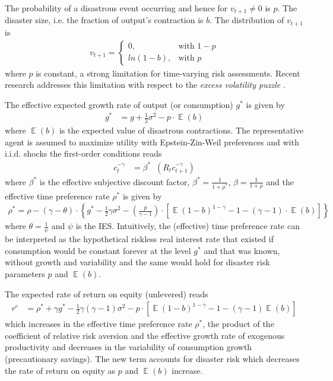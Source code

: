 The probability of a disastrous event occurring and hence for $v_{t+1} \neq 0$ is $p$. The disaster size, i.e. the fraction of output's contraction is $b$. The distribution of $v_{t+1}$ is
\begin{align*}
   v_{t+1} =
    \begin{cases}
        0,& \text{with } 1-p\\
        ln(1-b), & \text{with } p
    \end{cases}
\end{align*}
where $p$ is constant, a strong limitation for time-varying risk assessments. Recent research \cite{Tsai2015} addresses this limitation with respect to the \textit{excess volatility puzzle} \cite{Shiller1981}.

The effective expected growth rate of output (or consumption) $g^{*}$ is given by
\begin{align*}
    g^{*} &= g + \frac{1}{2} \sigma^{2} - p \cdot \mathop{\mathbb{E}}(b)
\end{align*}
where $\mathop{\mathbb{E}}(b)$ is the expected value of disastrous contractions.
The representative agent is assumed to maximize utility with Epstein-Zin-Weil preferences and with i.i.d. shocks the first-order conditions reads
\begin{align*}
    c_{t}^{-\gamma} &= \beta^{*} \mathop{\mathbb{E}_{t}}(R_{t} c_{t+1}^{-\gamma})
\end{align*}
where $\beta^{*}$ is the effective subjective discount factor, $\beta^{*} = \frac{1}{1+\rho^{*}}$, $\beta = \frac{1}{1+\rho}$ and the effective time preference rate $\rho^{*}$ is given by
\begin{align*}
    \rho^{*} = \rho - (\gamma - \theta) \cdot \left\{g^{*} - \frac{1}{2} \gamma \sigma^{2} - \left(\frac{p}{\gamma -1}\right) \cdot [\mathop{\mathbb{E}}(1-b)^{1-\gamma}-1-(\gamma-1) \cdot \mathop{\mathbb{E}}(b)]\right\}
\end{align*}
where $\theta = \frac{1}{\psi}$ and $\psi$ is the IES. Intuitively, the (effective) time preference rate can be interpreted as the hypothetical riskless real interest rate that existed if consumption would be constant forever at the level $g^{*}$ and that was known, without growth and variability and the same would hold for disaster risk parameters $p$ and $\mathop{\mathbb{E}}(b)$.

The expected rate of return on equity (unlevered) reads
\begin{align*}
    r^{e} &= \rho^{*} + \gamma g^{*} - \frac{1}{2} \gamma (\gamma-1) \sigma^{2} - p \cdot [\mathop{\mathbb{E}}(1-b)^{1-\gamma}-1-(\gamma-1) \mathop{\mathbb{E}}(b)]
\end{align*}
which increases in the effective time preference rate $\rho^{*}$, the product of the coefficient of relative risk aversion and the effective growth rate of exogenous productivity and decreases in the variability of consumption growth (precautionary savings). The new term accounts for disaster risk which decreases the rate of return on equity as $p$ and $\mathop{\mathbb{E}}(b)$ increase.

